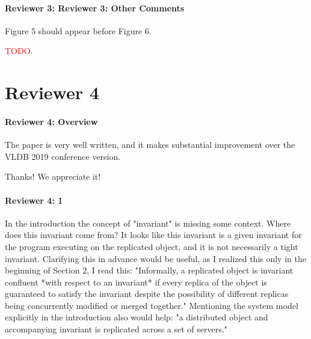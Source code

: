 \documentclass[9pt]{article}
\begin{document}
\begin{multicols*}{2}
\paragraph{Reviewer 3: Reviewer 3: Other Comments}
\begin{feedback}
  Figure 5 should appear before Figure 6.
\end{feedback}
\textcolor{red}{TODO.}

\section*{Reviewer 4}
\paragraph{Reviewer 4: Overview}
\begin{feedback}
  The paper is very well written, and it makes substantial improvement over the
  VLDB 2019 conference version.
\end{feedback}
Thanks! We appreciate it!

\paragraph{Reviewer 4: 1}
\begin{feedback}
  In the introduction the concept of "invariant" is missing some context. Where
  does this invariant come from? It looks like this invariant is a given
  invariant for the program executing on the replicated object, and it is not
  necessarily a tight invariant.  Clarifying this in advance would be useful,
  as I realized this only in the beginning of Section 2, I read this:
  "Informally, a replicated object is invariant confluent *with respect to an
  invariant* if every replica of the object is guaranteed to satisfy the
  invariant despite the possibility of different replicas being concurrently
  modified or merged together." Mentioning the system model explicitly in the
  introduction also would help: "a distributed object and accompanying
  invariant is replicated across a set of servers."
\end{feedback}


\end{multicols*}
\end{document}
